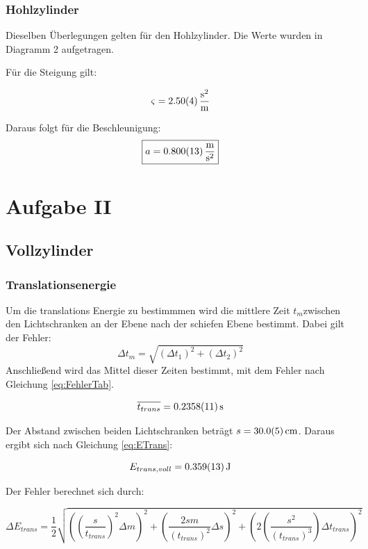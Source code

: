 \subsubsection{Hohlzylinder}

Dieselben Überlegungen gelten für den Hohlzylinder. Die Werte wurden in Diagramm 2 aufgetragen.

Für die Steigung gilt:

\[\varsigma = \SI{2.50 \pm 0,04}{\frac{\second^2}{\meter}} \]

Daraus folgt für die Beschleunigung:
\[\boxed{a = \SI{ 0,800 \pm 0,013}{\frac{\meter}{\second^2}}}\]

\newpage
\section{Aufgabe II}

\subsection{Vollzylinder}

\subsubsection{Translationsenergie}
Um die translations Energie zu bestimmmen wird die mittlere Zeit $t_m$zwischen den Lichtschranken an der Ebene nach der schiefen Ebene bestimmt. Dabei gilt der Fehler:
\begin{equation}
    \Delta t_m = \sqrt{(\Delta t_1)^2+ (\Delta t_2)^2}
\end{equation}
Anschließend wird das Mittel dieser Zeiten bestimmt, mit dem Fehler nach Gleichung \ref{eq:FehlerTab}.

\[\overline{t_{trans}} = \SI{0,2358 \pm 0,0011}{\second}\]

Der Abstand zwischen beiden Lichtschranken beträgt $s = \SI{30,0 \pm 0,5}{\cm}$. Daraus ergibt sich nach Gleichung \ref{eq:ETrans}:

\[E_{trans,voll} = \SI{0,359\pm 0,013}{\joule}\]

Der Fehler berechnet sich durch:

\begin{equation}
    \Delta E_{trans} = \frac{1}{2}\sqrt{\left(\left(\frac{s}{t_{trans}}\right)^2\Delta m\right)^2 + \left(\frac{2sm}{(t_{trans})^2}\Delta s\right)^2 +\left(2\left(\frac{s^2}{(t_{trans})^3}\right)\Delta t_{trans}\right)^2}
\end{equation}

